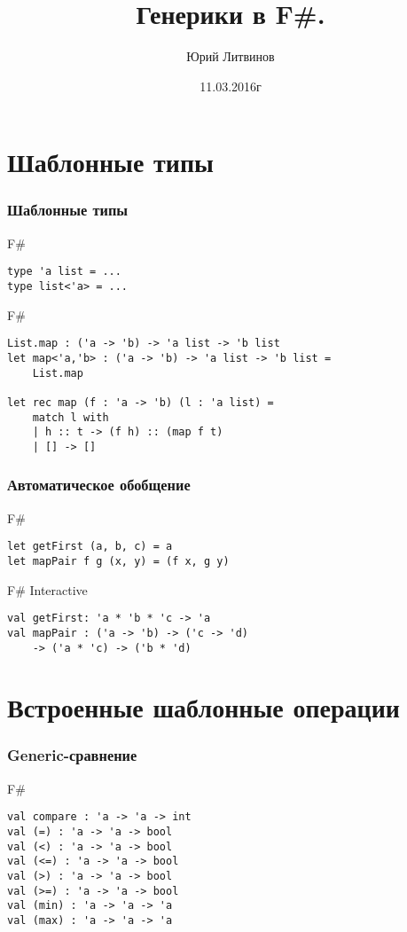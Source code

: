 \documentclass[xetex,mathserif,serif]{beamer}
\title{Генерики в F\#.}
\author{Юрий Литвинов}
\date{11.03.2016г}
\begin{document}
	
	\frame{\titlepage}
	
	\section{Шаблонные типы}
	
	\begin{frame}[fragile]
		\frametitle{Шаблонные типы}
		\begin{exampleblock}{F\#}
			\begin{lstlisting}
type 'a list = ...
type list<'a> = ...
\end{lstlisting}
\end{exampleblock}

		\begin{exampleblock}{F\#}
			\begin{lstlisting}
List.map : ('a -> 'b) -> 'a list -> 'b list
let map<'a,'b> : ('a -> 'b) -> 'a list -> 'b list = 
    List.map

let rec map (f : 'a -> 'b) (l : 'a list) =
    match l with
    | h :: t -> (f h) :: (map f t)
    | [] -> []
\end{lstlisting}
\end{exampleblock}
\end{frame}

	\begin{frame}[fragile]
		\frametitle{Автоматическое обобщение}
		\begin{exampleblock}{F\#}
			\begin{lstlisting}
let getFirst (a, b, c) = a
let mapPair f g (x, y) = (f x, g y)
\end{lstlisting}
\end{exampleblock}

		\begin{alertblock}{F\# Interactive}
			\begin{lstlisting}
val getFirst: 'a * 'b * 'c -> 'a
val mapPair : ('a -> 'b) -> ('c -> 'd) 
    -> ('a * 'c) -> ('b * 'd)
\end{lstlisting}
\end{alertblock}
\end{frame}
	
	\section{Встроенные шаблонные операции}

	\begin{frame}[fragile]
		\frametitle{Generic-сравнение}
		\begin{exampleblock}{F\#}
			\begin{lstlisting}
val compare : 'a -> 'a -> int
val (=) : 'a -> 'a -> bool
val (<) : 'a -> 'a -> bool
val (<=) : 'a -> 'a -> bool
val (>) : 'a -> 'a -> bool
val (>=) : 'a -> 'a -> bool
val (min) : 'a -> 'a -> 'a
val (max) : 'a -> 'a -> 'a
\end{lstlisting}
\end{exampleblock}
\end{frame}
\end{document}
